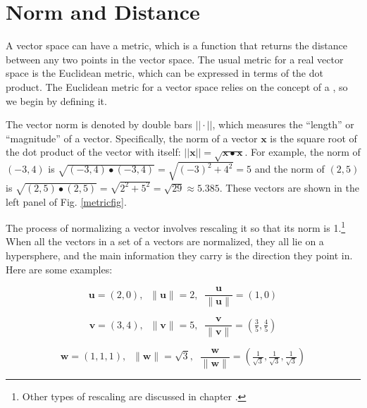 \section{Norm and Distance}\label{metricSpace}

   A vector space can have a metric, which is a function that returns the 
distance between any two points in the vector space. The usual metric for a 
real vector space is the Euclidean metric, which can be expressed in terms of 
the dot product. The Euclidean metric for a vector space relies on the concept of a , so we begin by defining it.

The vector norm is denoted by double bars $|| \cdot ||$, which measures the ``length'' or 
``magnitude'' of a vector. Specifically, the norm of a vector $\mathbf{x}$ is 
the square root of the dot product of the vector with itself: $||\mathbf{x}|| = 
\sqrt{\mathbf{x} \bullet \mathbf{x}}$. For example, the norm of $(-3,4)$ is $\sqrt{(-3,4) \bullet (-3,4)}  = \sqrt{(-3)^2+4^2} = 5$ and the norm 
of $(2,5)$ is $ \sqrt{(2,5) \bullet (2,5)} = \sqrt{2^2+5^2} =  \sqrt{29} \approx 5.385$. These vectors are 
shown in the left panel of Fig. \ref{metricfig}. 

The process of normalizing a vector involves rescaling it so that its norm is 1.\footnote{Other types of rescaling are discussed in chapter .} When all the vectors in a set of a vectors are normalized, they all lie on a hypersphere, and the main information they carry is the direction they point in. Here are some examples:
\begin{description}
\item $$\textbf{u} = (2,0), \;\; \|\textbf{u}\| = 2, \;\; 
\frac{\textbf{u}}{\|\textbf{u}\|} = (1,0)$$
\item $$\textbf{v} = (3,4), \;\; \|\textbf{v}\| = 5, \;\; 
\frac{\textbf{v}}{\|\textbf{v}\|} = \left(\tfrac{3}{5}, \tfrac{4}{5}\right)$$
\item $$\textbf{w} = (1,1,1), \;\; \|\textbf{w}\| = \sqrt{3}, \;\; 
\frac{\textbf{w}}{\|\textbf{w}\|} = \left(\tfrac{1}{\sqrt{3}}, \tfrac{1}{\sqrt{3}}, \tfrac{1}{\sqrt{3}}\right)$$
\end{description}

